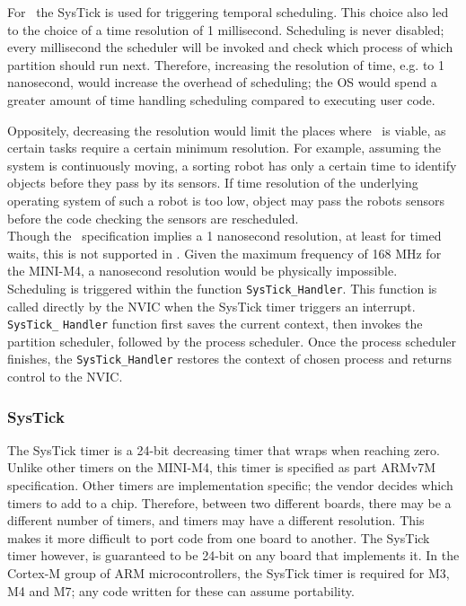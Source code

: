 For \OSname\ the SysTick is used for triggering temporal scheduling. This choice
also led to the choice of a time resolution of 1 millisecond. Scheduling is
never disabled; every millisecond the scheduler will be invoked and check which
process of which partition should run next. Therefore, increasing the resolution
of time, e.g. to 1 nanosecond, would increase the overhead of scheduling; the OS
would spend a greater amount of time handling scheduling compared to executing
user code.

Oppositely, decreasing the resolution would limit the places where \OSname\ is
viable, as certain tasks require a certain minimum resolution. For example,
assuming the system is continuously moving, a sorting robot has only a certain
time to identify objects before they pass by its sensors. If time resolution of
the underlying operating system of such a robot is too low, object may pass the
robots sensors before the code checking the sensors are rescheduled.\\

Though the \arinc\ specification implies a 1 nanosecond resolution, at least for
timed waits, this is not supported in \OSname . Given the maximum frequency of
168 MHz for the MINI-M4, a nanosecond resolution would be physically impossible.\\

Scheduling is triggered within the function \texttt{SysTick\_Handler}. This
function is called directly by the NVIC when the SysTick timer triggers an
interrupt. \texttt{SysTick\_} \texttt{Handler} function first saves the current
context, then invokes the partition scheduler, followed by the process scheduler.
Once the process scheduler finishes, the \texttt{SysTick\_}\texttt{Handler}
restores the context of chosen process and returns control to the NVIC.

\subsubsection{SysTick}
The SysTick timer is a 24-bit decreasing timer that wraps when reaching zero.
Unlike other timers on the MINI-M4, this timer is specified as part ARMv7M
specification. Other timers are implementation specific; the vendor decides
which timers to add to a chip. Therefore, between two different boards, there
may be a different number of timers, and timers may have a different resolution.
This makes it more difficult to port code from one board to another. The SysTick
timer however, is guaranteed to be 24-bit on any board that implements it. In the
Cortex-M group of ARM microcontrollers, the SysTick timer is required for M3, M4
and M7; any code written for these can assume portability.\\

